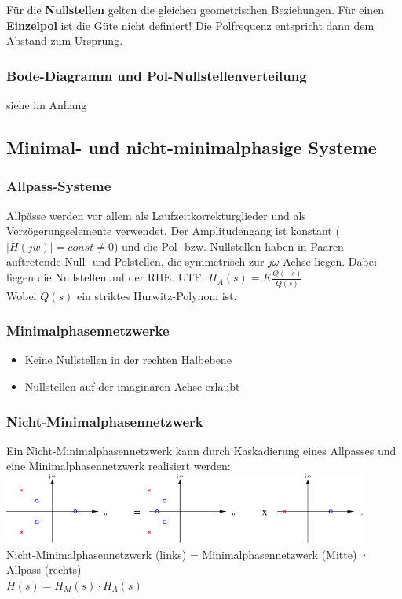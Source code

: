   Für die \textbf{Nullstellen} gelten die gleichen geometrischen Beziehungen.
  Für einen \textbf{Einzelpol} ist die Güte nicht definiert! Die Polfrequenz entspricht dann dem Abstand zum Ursprung.
  
  \subsubsection{Bode-Diagramm und Pol-Nullstellenverteilung}
  siehe im Anhang

\subsection{Minimal- und nicht-minimalphasige Systeme }
\subsubsection{Allpass-Systeme}
Allpässe werden vor allem als Laufzeitkorrekturglieder und als
Verzögerungselemente verwendet. Der Amplitudengang ist konstant ($|H(jw)| =
const \neq 0$) und die Pol- bzw. Nullstellen haben in Paaren auftretende Null-
und Polstellen, die symmetrisch zur $j \omega$-Achse liegen. Dabei liegen die
Nullstellen auf der RHE.
UTF: $H_A(s) = K \frac{Q(-s)}{Q(s)}$ \\
Wobei $Q(s)$ ein striktes Hurwitz-Polynom ist.



\subsubsection{Minimalphasennetzwerke }
\begin{itemize}
  \item Keine Nullstellen in der rechten Halbebene
  \item Nullstellen auf der imaginären Achse erlaubt
\end{itemize}


\subsubsection{Nicht-Minimalphasennetzwerk }
Ein Nicht-Minimalphasennetzwerk kann durch Kaskadierung eines Allpasses und
eine Minimalphasennetzwerk realisiert werden:\\
\includegraphics[width=12cm]{./images/nicht-minimalphasennetzwerk.png}\\
Nicht-Minimalphasennetzwerk (links) = Minimalphasennetzwerk (Mitte) · Allpass (rechts) \\
$H(s) = H_M(s) \cdot H_A(s)$

